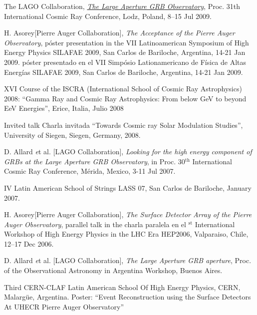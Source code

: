 \begin{etaremune}
\item {}The LAGO Collaboration,
\href{http://arxiv.org/abs/0906.0816}{\emph{The Large Aperture GRB
Observatory}}, \en Proc. 31th International Cosmic Ray Conference, Lodz,
Poland, 8--15 Jul 2009.

\item {}H. Asorey[Pierre Auger Collaboration], {\emph{The Acceptance of the
Pierre Auger Observatory}}, 
\ifeng
póster presentation in the VII Latinoamerican Symposium of High Energy Physics SILAFAE 2009, San Carlos de Bariloche, Argentina, 14-21 Jan 2009.
\else
póster presentado en el VII Simpósio Lationamericano de Física de Altas Energías SILAFAE 2009, San Carlos de Bariloche, Argentina, 14-21 Jan 2009.
\fi

\item {}XVI Course of the ISCRA (International School of Cosmic Ray Astrophysics) 2008: ``Gamma Ray and Cosmic Ray Astrophysics: From below GeV to beyond EeV Energies'', Erice, Italia, Julio 2008

\item {}\ifeng Invited talk \else Charla invitada \fi ``Towards Cosmic ray Solar Modulation Studies'', University of Siegen, Siegen, Germany, 2008.

\item {}D. Allard {\emph et al.} [LAGO Collaboration], {\emph{Looking for the high energy component of GRBs at the Large Aperture GRB Observatory}}, in Proc. 30$^{\mathrm{th}}$ International Cosmic Ray Conference,  Mérida, Mexico, 3-11 Jul 2007.

\item {}IV Latin American School of Strings LASS 07, San Carlos de Bariloche, January 2007.

\item {}H. Asorey[Pierre Auger Collaboration], {\emph{The Surface Detector Array of the Pierre Auger Observatory}}, 
\ifeng
parallel talk in the 
\else
charla paralela en el 
$^{\mathrm{st}}$ International Workshop of High Energy Physics in the LHC Era HEP2006, Valparaiso, Chile, 12--17 Dec 2006.

\item {}D. Allard {\emph et al.} [LAGO Collaboration], {\emph{The Large Aperture GRB aperture}}, \en Proc. of the Observational Astronomy in Argentina Workshop, Buenos Aires.

\item {}Third CERN-CLAF Latin American School Of High Energy Physics, CERN, Malargüe, Argentina. Poster: ``Event Reconstruction using the Surface Detectors At UHECR Pierre Auger Observatory''


\end{etaremune}
